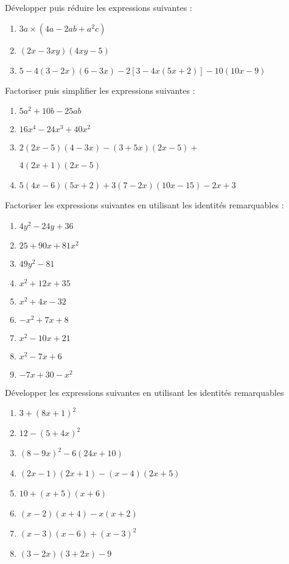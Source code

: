 


\begin{exercice}[]
Développer puis réduire les expressions suivantes :
\begin{enumerate}
\item $3a\times (4a-2ab+a^2c)$
\item $(2x-3xy)(4xy-5)$
\item $5-4(3-2x)(6-3x)-2[3-4x(5x+2)]-10(10x-9)$
\end{enumerate}
\end{exercice}
\medskip
\begin{exercice}[]
Factoriser puis simplifier les expressions suivantes :
\begin{enumerate}
\item $5a^2+10b-25ab$
\item $16x^4-24x^3+40x^2$
\item $2(2x-5)(4-3x)-(3+5x)(2x-5)+$

$4(2x+1)(2x-5)$
\item $5(4x-6)(5x+2)+3(7-2x)(10x-15)-2x+3$
\end{enumerate}
\end{exercice}
\medskip
\begin{exercice}[]
Factoriser les expressions suivantes en utilisant les identités remarquables :
\begin{multicols}{2}
\begin{enumerate}
\item $4y^2-24y+36$
\item $25+90x+81x^2$
\item $49y^2-81$
\item $x^2+12x+35$
\item $x^2+4x-32$
\item $-x^2+7x+8$
\item $x^2-10x+21$
\item $x^2-7x+6$
\item $-7x+30-x^2$
\end{enumerate}
\end{multicols}
\end{exercice}
\medskip
\begin{exercice}[]
Développer les expressions suivantes en utilisant les identités remarquables
\begin{enumerate}
\item $3+(8x+1)^2$
\item $12-(5+4x)^2$
\item $(8-9x)^2-6(24x+10)$
\item $(2x-1)(2x+1)-(x-4)(2x+5)$
\item $10+(x+5)(x+6)$
\item $(x-2)(x+4)-x(x+2)$
\item $(x-3)(x-6)+(x-3)^2$
\item $(3-2x)(3+2x)-9$
\end{enumerate}
\end{exercice}
